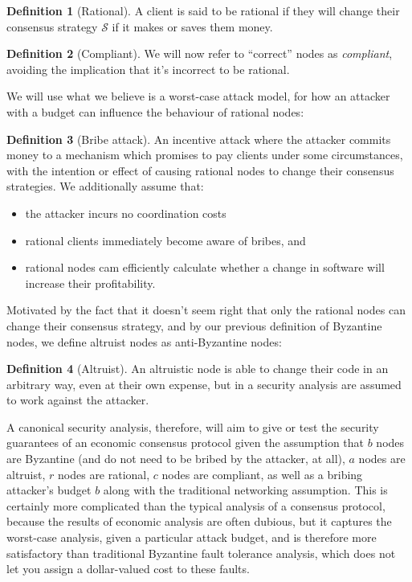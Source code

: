 \documentclass[11pt,a4paper]{article}
\theoremstyle{plain}
\theoremstyle{definition}
\newtheorem{defn}{Definition}
\begin{document}
\begin{defn}[Rational]
A client is said to be rational if they will change their consensus strategy $\mathcal{S}$ if it makes or saves them money.
\end{defn}

\begin{defn}[Compliant]
We will now refer to ``correct'' nodes as \emph{compliant}, avoiding the implication that it's incorrect to be rational.
\end{defn}

We will use what we believe is a worst-case attack model, for how an attacker with a budget can influence the behaviour of rational nodes:

\begin{defn}[Bribe attack]
An incentive attack where the attacker commits money to a mechanism which promises to pay clients under some circumstances, with the intention or effect of causing rational nodes to change their consensus strategies. We additionally assume that: 
\begin{itemize}
\item the attacker incurs no coordination costs
\item rational clients immediately become aware of bribes, and
\item rational nodes cam efficiently calculate whether a change in software will increase their profitability.
\end{itemize}
\end{defn}


Motivated by the fact that it doesn't seem right that only the rational nodes can change their consensus strategy, and by our previous definition of Byzantine nodes, we define altruist nodes as anti-Byzantine nodes:

\begin{defn}[Altruist]
An altruistic node is able to change their code in an arbitrary way, even at their own expense, but in a security analysis are assumed to work against the attacker.
\end{defn}

A canonical security analysis, therefore, will aim to give or test the security guarantees of an economic consensus protocol given the assumption that $b$ nodes are Byzantine (and do not need to be bribed by the attacker, at all), $a$ nodes are altruist, $r$ nodes are rational, $c$ nodes are compliant, as well as a bribing attacker's budget $b$ along with the traditional networking assumption. This is certainly more complicated than the typical analysis of a consensus protocol, because the results of economic analysis are often dubious, but it captures the worst-case analysis, given a particular attack budget, and is therefore more satisfactory than traditional Byzantine fault tolerance analysis, which does not let you assign a dollar-valued cost to these faults. 
\end{document}
